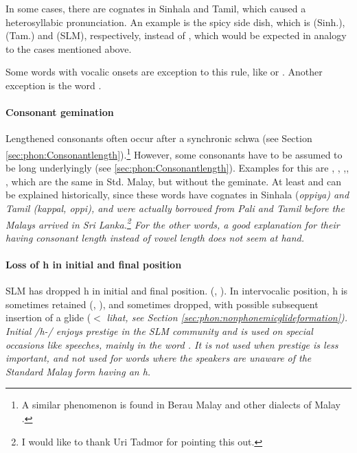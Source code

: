 In some cases, there are cognates in Sinhala and Tamil, which caused a heterosyllabic pronunciation.
An example is the spicy side dish, which is (Sinh.), (Tam.) and (SLM), respectively, instead of , which would be expected in analogy to the cases mentioned above.

Some words with vocalic onsets are exception to this rule, like  or . Another exception is the word .

\paragraph{Consonant gemination}\label{sec:phon:hist:consonantgemination}
Lengthened consonants often occur after a synchronic schwa (see Section \ref{sec:phon:Consonantlength}).\footnote{A similar phenomenon is found in Berau Malay \citep{Collins1992Berau,Adelaar2005struct} and other dialects of Malay \citep[206]{Adelaar2005struct}.} However, some consonants have to be assumed to be long underlyingly (see \ref{sec:phon:Consonantlength}).  Examples for this are , , ,, , which are the same in Std. Malay, but without the geminate. At least  and  can be explained historically, since these words have cognates in Sinhala (\em \dentt oppiya\em) and Tamil (\em kappal, \dentt oppi\em), and were actually borrowed from Pali and Tamil before the Malays arrived in Sri Lanka.\footnote{I would like to thank Uri Tadmor for pointing this out.} For the other words, a good explanation for their having consonant length instead of vowel length does not seem at hand.


\paragraph{Loss of h in initial and final position}
SLM has dropped h in  initial and final position. (, ). In intervocalic position, h is sometimes retained (, ), and sometimes dropped, with possible subsequent insertion of a glide ($<$ \em lihat\em, see Section \ref{sec:phon:nonphonemicglideformation}). Initial /h-/ enjoys prestige in the SLM community and is used on special occasions like speeches, mainly in the word . It is not used when prestige is less important, and not used for words where the speakers are unaware of the Standard Malay form having an h.

